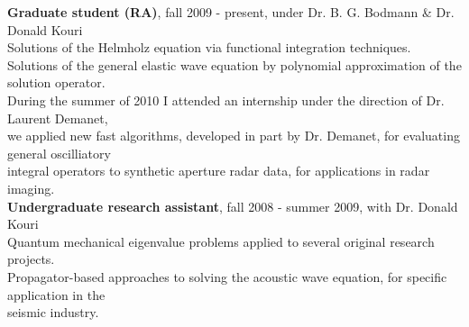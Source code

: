 \documentclass[letterpaper]{article}
\begin{document}
\begin{flushleft}
\hspace{0.25in} {\bf Graduate student (RA)}, fall 2009 - present, under Dr. B. G. Bodmann \& Dr. Donald Kouri \\
\vspace{0.15in} 
\hspace{0.75in} Solutions of the Helmholz equation via functional integration techniques.\\
\vspace{0.15in} 
\hspace{0.75in} Solutions of the general elastic wave equation by polynomial approximation of the solution operator. \\
\vspace{0.15in} 
\hspace{0.75in} During the summer of 2010 I attended an internship under the direction of Dr. Laurent Demanet, \\
\hspace{0.75in} we applied new fast algorithms, developed in part by Dr. Demanet, for evaluating general oscilliatory \\
\hspace{0.75in} integral operators to synthetic aperture radar data, for applications in radar imaging. \\
\vspace{0.15in} 
\hspace{0.25in} {\bf Undergraduate research assistant}, fall 2008 - summer 2009, with Dr. Donald Kouri\\
\vspace{0.15in} 
\hspace{0.75in} Quantum mechanical eigenvalue problems applied to several original research projects.\\
\vspace{0.15in}
\hspace{0.75in} Propagator-based approaches to solving the acoustic wave equation, for specific application in the\\
\hspace{0.75in} seismic industry.\\
\end{flushleft}
\end{document}
